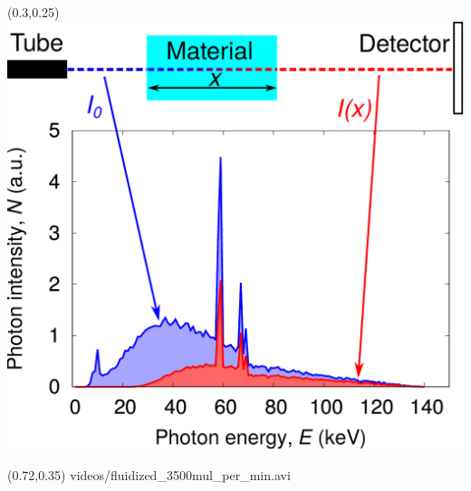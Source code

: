 \begin{frame}
\begin{textblock}{0.4}(0.3,0.25)
	\centering
	\includegraphics[width=\textwidth]
	{Sources/beam_hardening/x-ray_spectra_beam_hardening.pdf}
\end{textblock}
	
\begin{textblock}{0.25}(0.72,0.35)
	\centering
	\centering
	{videos/fluidized_3500mul_per_min.avi}
\end{textblock}

\end{frame}


